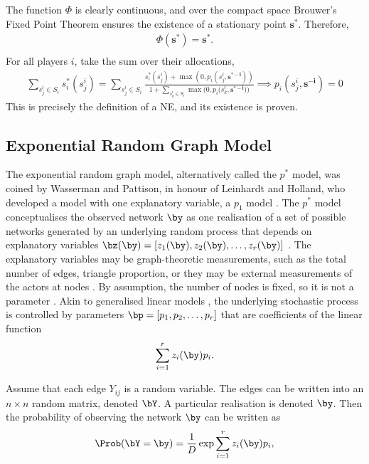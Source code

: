 The function $\Phi$ is clearly continuous, and over the compact space Brouwer's Fixed Point Theorem ensures the existence of a stationary point $\mathbf{s^*}$. Therefore, \\
\begin{align*}
    \Phi(\mathbf{s^*}) = \mathbf{s^*}. \\
\end{align*}
For all players $i$, take the sum over their allocations, \\
\begin{align*}
     \sum_{s_j^i \in S_i} s_i^*(s_j^i) = \sum_{s_j^i \in S_i} \frac{s_i^*(s_j^i) + \max{(0,p_i(s_j^i,\mathbf{s^{*-i}}) )}}{1 + \sum_{s_k^i \in S_i} \max{(0,p_i(s_k^i,\mathbf{{s^{*-i}}) )}} } \implies p_i(s_j^i,\mathbf{s^{-i}}) = 0
\end{align*}
This is precisely the definition of a NE, and its existence is proven. \\

\subsection{Exponential Random Graph Model}
 The exponential random graph model, alternatively called the $p^*$ model, was coined by Wasserman and Pattison, in honour of Leinhardt and Holland, who developed a model with one explanatory variable, a $p_1$ model \cite {RN83}. The $p^*$ model conceptualises the observed network $\by$ as one realisation of a set of possible networks generated by an underlying random process that depends on explanatory variables $\bz(\by) = [z_1(\by), z_2(\by), \dots, z_r(\by)]$ \cite{RN64}. The explanatory variables may be graph-theoretic measurements, such as the total number of edges, triangle proportion, or they may be external measurements of the actors at nodes \cite{RN86}. By assumption, the number of nodes is fixed, so it is not a parameter \cite{RN64}. Akin to generalised linear models \cite{RN83}, the underlying stochastic process is controlled by parameters $\bp = [p_1,p_2,\dots,p_r]$ that are coefficients of the linear function $$\sum_{i=1}^r z_i(\by)p_i. $$ 

 
 Assume that each edge $Y_{ij}$ is a random variable. The edges can be written into an $n\times n$ random matrix, denoted $\bY$. A particular realisation is denoted $\by$. Then the probability of observing the network $\by$ can be written as \\
 $$ \Prob (\bY = \by) = \frac{1}{D}\exp{\sum_{i=1}^r z_i(\by)p_i},$$
 
